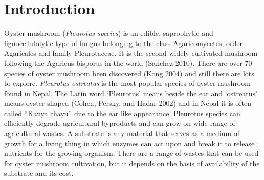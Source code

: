 \documentclass[]{article}
\begin{document}
\hypertarget{introduction}{%
\section{Introduction}\label{introduction}}

Oyster mushroom (\textit{Pleurotus species}) is an edible, saprophytic and lignocellulolytic type of fungus belonging to the class Agaricomycetes, order Agaricales and family Pleurotaceae. It is the second widely cultivated mushroom following the Agaricus bisporus in the world (Sańchez 2010). There are over 70 species of oyster mushroom been discovered (Kong 2004) and still there are lots to explore. \textit{Pleurotus ostreatus} is the most popular species of oyster mushroom found in Nepal. The Latin word `Pleurotus' means beside the ear and `ostreatus' means oyster shaped (Cohen, Persky, and Hadar 2002) and in Nepal it is often called ``Kanya chayu'' due to the ear like appearance. Pleurotus species can efficiently degrade agricultural byproducts and can grow on wide range of agricultural wastes. A substrate is any material that serves as a medium of growth for a living thing in which enzymes can act upon and break it to release nutrients for the growing organism. There are a range of wastes that can be used for oyster mushroom cultivation, but it depends on the basis of availability of the substrate and its cost.
\end{document}
